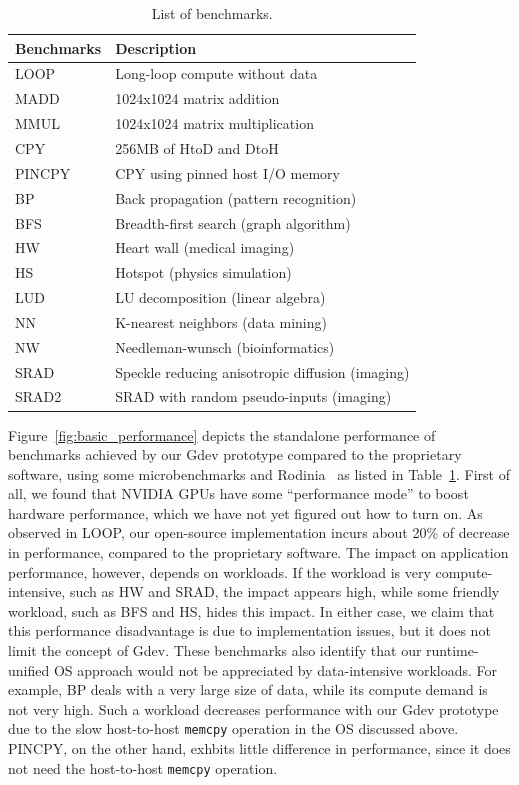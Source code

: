 \begin{table}[t]
 \caption{List of benchmarks.}
 \label{tab:benchmarks}
 \begin{center}
  {\footnotesize
  \begin{tabular}{|l|l|}
   \hline
   \textbf{Benchmarks} & \textbf{Description}\\
   \hline
   LOOP & Long-loop compute without data \\
   \hline
   MADD & 1024x1024 matrix addition\\
   \hline
   MMUL & 1024x1024 matrix multiplication\\
   \hline
   CPY & 256MB of HtoD and DtoH\\
   \hline
   PINCPY & CPY using pinned host I/O memory\\
   \hline
   BP & Back propagation (pattern recognition)\\
   \hline
   BFS & Breadth-first search (graph algorithm)\\
   \hline
   HW & Heart wall (medical imaging)\\
   \hline
   HS & Hotspot (physics simulation)\\
   \hline
   LUD & LU decomposition (linear algebra)\\
   \hline
   NN & K-nearest neighbors (data mining)\\
   \hline
   NW & Needleman-wunsch (bioinformatics)\\
   \hline
   SRAD & Speckle reducing anisotropic diffusion (imaging)\\
   \hline
   SRAD2 & SRAD with random pseudo-inputs (imaging)\\
   \hline
  \end{tabular}
  }
 \end{center}
\vspace{-1.5em}
\end{table}

Figure~\ref{fig:basic_performance} depicts the standalone performance of
benchmarks achieved by our Gdev prototype compared to the 
proprietary software, using some microbenchmarks and
Rodinia~\cite{Che_IISWC09} as listed in Table~\ref{tab:benchmarks}.
First of all, we found that NVIDIA GPUs have some ``performance mode''
to boost hardware performance, which we have not yet figured out how to
turn on.
As observed in LOOP, our open-source implementation incurs about 20\% of
decrease in performance, compared to the proprietary software.
The impact on application performance, however, depends on workloads.
If the workload is very compute-intensive, such as HW and SRAD, the
impact appears high, while some friendly workload, such as BFS and
HS, hides this impact.
In either case, we claim that this performance disadvantage is due to
implementation issues, but it does not limit the concept of Gdev.
These benchmarks also identify that our runtime-unified OS approach
would not be appreciated by data-intensive workloads.
For example, BP deals with a very large size of data, while its compute
demand is not very high.
Such a workload decreases performance with our Gdev prototype due to the
slow host-to-host \texttt{memcpy} operation in the OS discussed above.
PINCPY, on the other hand, exhbits little difference in
performance, since it does not need the host-to-host \texttt{memcpy}
operation.

